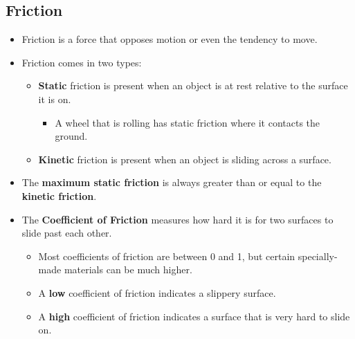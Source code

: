 \documentclass[letterpaper, 12pt]{article}
\begin{document}
\subsection*{Friction}
\begin{itemize}
	\item Friction is a force that opposes motion or even the tendency to move.
	\item Friction comes in two types:
	\begin{itemize}
		\item \textbf{Static} friction is present when an object is at rest relative to the surface it is on.
		\begin{itemize}
			\item A wheel that is rolling has static friction where it contacts the ground. 
		\end{itemize}
		\item \textbf{Kinetic} friction is present when an object is sliding across a surface.  
	\end{itemize}
	\item The \textbf{maximum static friction} is always greater than or equal to the \textbf{kinetic friction}.
	\item The \textbf{Coefficient of Friction} measures how hard it is for two surfaces to slide past each other. 
	\begin{itemize}
		\item Most coefficients of friction are between 0 and 1, but certain specially-made materials can be much higher.
		\item A \textbf{low} coefficient of friction indicates a slippery surface.
		\item A \textbf{high} coefficient of friction indicates a surface that is very hard to slide on. 
	\end{itemize} 
	
\end{itemize}
 
\end{document}
